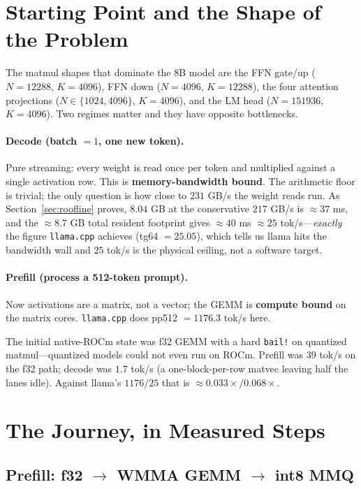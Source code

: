 \documentclass[11pt]{article}
\begin{document}
\section{Starting Point and the Shape of the Problem}

The matmul shapes that dominate the 8B model are the FFN gate/up ($N=12288$, $K=4096$), FFN down ($N=4096$, $K=12288$), the four attention projections ($N\in\{1024,4096\}$, $K=4096$), and the LM head ($N=151936$, $K=4096$). Two regimes matter and they have opposite bottlenecks.

\paragraph{Decode (batch $=1$, one new token).} Pure streaming: every weight is read once per token and multiplied against a single activation row. This is \textbf{memory-bandwidth bound}. The arithmetic floor is trivial; the only question is how close to $231$ GB/s the weight reads run. As Section~\ref{sec:roofline} proves, $8.04$ GB at the conservative $217$ GB/s is $\approx 37$ ms, and the $\approx 8.7$ GB total resident footprint gives $\approx 40$ ms $\approx 25$ tok/s---\emph{exactly} the figure \texttt{llama.cpp} achieves (tg64 $=25.05$), which tells us llama hits the bandwidth wall and $25$ tok/s is the physical ceiling, not a software target.

\paragraph{Prefill (process a 512-token prompt).} Now activations are a matrix, not a vector; the GEMM is \textbf{compute bound} on the matrix cores. \texttt{llama.cpp} does pp512 $=1176.3$ tok/s here.

The initial native-ROCm state was f32 GEMM with a hard \texttt{bail!} on quantized matmul---quantized models could not even run on ROCm. Prefill was $39$ tok/s on the f32 path; decode was $1.7$ tok/s (a one-block-per-row matvec leaving half the lanes idle). Against llama's $1176/25$ that is $\approx 0.033\times / 0.068\times$.

\section{The Journey, in Measured Steps}

\subsection{Prefill: f32 $\to$ WMMA GEMM $\to$ int8 MMQ}
\end{document}
